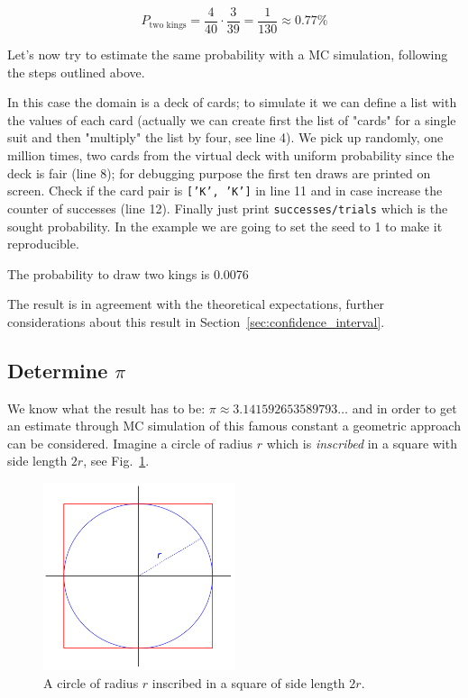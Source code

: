 \begin{equation*}
P_\textrm{two kings} = \frac{4}{40} \cdot \frac{3}{39} = \frac{1}{130} \approx 0.77\%
\end{equation*}

Let's now try to estimate the same probability with a MC simulation, following the steps outlined above.


In this case the domain is a deck of cards; to simulate it we can define a list with the values of each card (actually we can create first the list of "cards" for a single suit and then "multiply" the list by four, see line 4). We pick up randomly, one million times, two cards from the virtual deck with uniform probability since the deck is fair (line 8); for debugging purpose the first ten draws are printed on screen. Check if the card pair is \texttt{['K', 'K']} in line 11 and in case increase the counter of successes (line 12). Finally just print \texttt{successes/trials} which is the sought probability.
In the example we are going to set the seed to 1 to make it reproducible.

\begin{ioutput}
['3' '2']
['2' '3']
['7' '3']
['Q' '4']
['7' '5']
['5' 'J']
['4' 'K']
['K' '2']
['5' 'Q']
['A' 'J']

The probability to draw two kings is 0.0076
\end{ioutput}

The result is in agreement with the theoretical expectations, further considerations about this result in Section~\ref{sec:confidence_interval}.

\subsection{Determine $\pi$}
\label{determine-pi}

We know what the result has to be: $\pi\approx 3.141592653589793\ldots$ and in order to get an estimate through MC simulation of this famous constant a geometric approach can be considered. Imagine a circle of radius $r$ which is \emph{inscribed} in a square with side length $2r$, see Fig.~\ref{fig:circle_inscribed}.

\begin{figure}[htb]
\centering
\includegraphics[width=0.5\textwidth]{figures/circle_inscribed}
\caption{A circle of radius $r$ inscribed in a square of side length $2r$.}
\label{fig:circle_inscribed}
\end{figure}

